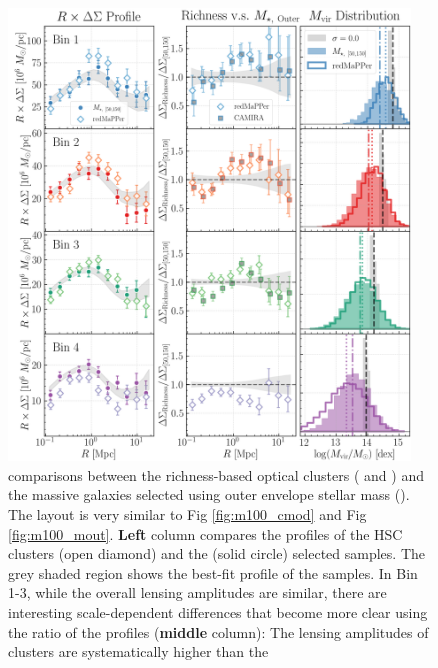 \documentclass[fleqn,usenatbib,useAMS,english]{mnras}
\begin{document}
  \begin{figure}
      \centering
      \includegraphics[width=0.95\textwidth]{figure/topn_fig_10}
      \caption{
          \topn{} comparisons between the richness-based optical clusters (\redm{} and \camira{})
          and the massive galaxies selected using outer envelope stellar mass ().
          The layout is very similar to Fig \ref{fig:m100_cmod} and Fig \ref{fig:m100_mout}.
          \textbf{Left} column compares the \rdsigma{} profiles of the HSC \redm{} clusters
          (open diamond) and the  (solid circle) selected samples.
          The grey shaded region shows the best-fit profile of the  samples.
          In Bin 1-3, while the overall lensing amplitudes are similar, there are interesting
          scale-dependent differences that become more clear using the ratio of the \dsigma{}
          profiles (\textbf{middle} column):
          The lensing amplitudes of \redm{} clusters are systematically higher than the
}
\end{figure}
\end{document}
